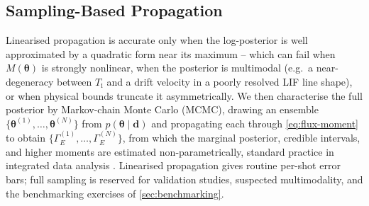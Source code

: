 \subsection{Sampling-Based Propagation}
\label{subsec:sampling}

Linearised propagation is accurate only when the log-posterior is well approximated by a quadratic form near its maximum -- which can fail when $M(\boldsymbol{\theta})$ is strongly nonlinear, when the posterior is multimodal (e.g.\ a near-degeneracy between $T_{\mathrm{i}}$ and a drift velocity in a poorly resolved LIF line shape), or when physical bounds truncate it asymmetrically. We then characterise the full posterior by Markov-chain Monte Carlo (MCMC), drawing an ensemble $\{\boldsymbol{\theta}^{(1)}, \dots, \boldsymbol{\theta}^{(N)}\}$ from $p(\boldsymbol{\theta} \mid \mathbf{d})$ and propagating each through \cref{eq:flux-moment} to obtain $\{\Gamma_{E}^{(1)}, \dots, \Gamma_{E}^{(N)}\}$, from which the marginal posterior, credible intervals, and higher moments are estimated non-parametrically, standard practice in integrated data analysis \cite{ref0706}. Linearised propagation gives routine per-shot error bars; full sampling is reserved for validation studies, suspected multimodality, and the benchmarking exercises of \cref{sec:benchmarking}.

